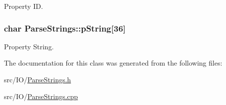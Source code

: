 Property ID. 

\subsubsection[{\texorpdfstring{p\+String}{pString}}]{\setlength{\rightskip}{0pt plus 5cm}char Parse\+Strings\+::p\+String\mbox{[}36\mbox{]}\hspace{0.3cm}{\ttfamily [private]}}\hypertarget{classParseStrings_a89114cea60b7a37e80c799cec5bcd03d}{}\label{classParseStrings_a89114cea60b7a37e80c799cec5bcd03d}


Property String. 



The documentation for this class was generated from the following files\+:\begin{DoxyCompactItemize}
\item 
src/\+I\+O/\hyperlink{ParseStrings_8h}{Parse\+Strings.\+h}\item 
src/\+I\+O/\hyperlink{ParseStrings_8cpp}{Parse\+Strings.\+cpp}\end{DoxyCompactItemize}
